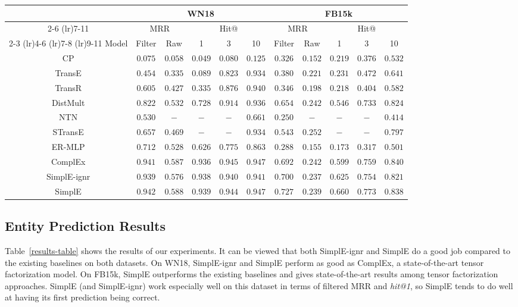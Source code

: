 \documentclass{article}
\begin{document}
\begin{table*}[t]
\scriptsize
\caption{Results on WN18 and FB15k. Best results are in bold.}
\label{results-table}
\begin{center}
\begin{tabular}{ccccccccccc}
\toprule
& \multicolumn{5}{c}{WN18} & \multicolumn{5}{c}{FB15k}                   \\
\cmidrule(lr){2-6} \cmidrule(lr){7-11}
& \multicolumn{2}{c}{MRR} & \multicolumn{3}{c}{Hit@} & \multicolumn{2}{c}{MRR} & \multicolumn{3}{c}{Hit@} \\
\cmidrule(lr){2-3} \cmidrule(lr){4-6} \cmidrule(lr){7-8} \cmidrule(lr){9-11}
Model & Filter & Raw & 1 & 3 & 10 & Filter & Raw & 1 & 3 & 10 \\ \hline
CP &  $0.075$ & $0.058$ & $0.049$ & $0.080$ & $0.125$ & $0.326$ &  $0.152$ &  $0.219$ & $0.376$ & $0.532$ \\
TransE & $0.454$ & $0.335$ & $0.089$ & $0.823$ & $0.934$ & $0.380$ & $0.221$ & $0.231$ & $0.472$ & $0.641$ \\
TransR & $0.605$ & $0.427$ & $0.335$ & $0.876$ & $0.940$ & $0.346$ & $0.198$ & $0.218$ & $0.404$ & $0.582$ \\
DistMult &  $0.822$ & $0.532$ & $0.728$ & $0.914$ & $0.936$ & $0.654$ & $0.242$ & $0.546$ & $0.733$ & $0.824$ \\
NTN & $0.530$ & $-$ & $-$ & $-$ & $0.661$ & $0.250$ & $-$ & $-$ & $-$ & $0.414$ \\
STransE & $0.657$ & $0.469$ & $-$ & $-$ & $0.934$ & $ 0.543$ & $\mathbf{0.252}$ & $-$ & $-$ & $0.797$ \\
ER-MLP & $0.712$ & $0.528$ & $0.626$ & $0.775$ & $0.863$ & $0.288$ & $0.155$ & $0.173$ & $0.317$ & $0.501$ \\
ComplEx & $0.941$ & $0.587$ & $0.936$ & $\mathbf{0.945}$ & $\mathbf{0.947}$ & $0.692$ & $0.242$ & $0.599$ & $0.759$ & $\mathbf{0.840}$ \\ \hline
SimplE-ignr & $0.939$ & $0.576$ & $0.938$ & $0.940$ & $0.941$ & $0.700$ & $0.237$ & $0.625$ & $0.754$ & $0.821$ \\
SimplE & $\mathbf{0.942}$ & $\mathbf{0.588}$ & $\mathbf{0.939}$ & $0.944$ & $\mathbf{0.947}$ & $\mathbf{0.727}$ & $0.239$ & $\mathbf{0.660}$ & $\mathbf{0.773}$ & $0.838$  
\end{tabular}
\end{center}
\end{table*}

\subsection{Entity Prediction Results}
Table~\ref{results-table} shows the results of our experiments. It can be viewed that both SimplE-ignr and SimplE do a good job compared to the existing baselines on both datasets. On WN18, SimplE-ignr and SimplE perform as good as ComplEx, a state-of-the-art tensor factorization model. On FB15k, SimplE outperforms the existing baselines and gives state-of-the-art results among tensor factorization approaches. SimplE (and SimplE-ignr) work especially well on this dataset in terms of filtered MRR and \emph{hit@1}, so SimplE tends to do well at having its first prediction being correct. 
\end{document}
